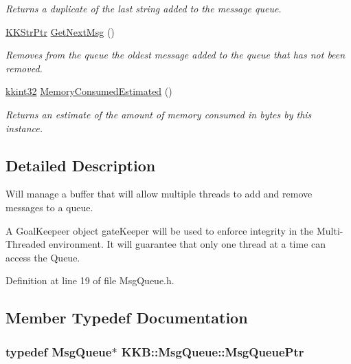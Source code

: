 \begin{DoxyCompactItemize}
\begin{DoxyCompactList}\small\item\em Returns a duplicate of the last string added to the message queue. \end{DoxyCompactList}\item 
\hyperlink{namespace_k_k_b_a9adbef5a6b3be0867f5570df2a08f388}{K\+K\+Str\+Ptr} \hyperlink{class_k_k_b_1_1_msg_queue_a4e280303e6b11471624e1274cc681649}{Get\+Next\+Msg} ()
\begin{DoxyCompactList}\small\item\em Removes from the queue the oldest message added to the queue that has not been removed. \end{DoxyCompactList}\item 
\hyperlink{namespace_k_k_b_a8fa4952cc84fda1de4bec1fbdd8d5b1b}{kkint32} \hyperlink{class_k_k_b_1_1_msg_queue_afe6ceeb9745ccf087a35eca6e83b026f}{Memory\+Consumed\+Estimated} ()
\begin{DoxyCompactList}\small\item\em Returns an estimate of the amount of memory consumed in bytes by this instance. \end{DoxyCompactList}\end{DoxyCompactItemize}


\subsection{Detailed Description}
Will manage a buffer that will allow multiple threads to add and remove messages to a queue. 

A \textquotesingle{}Goal\+Keepeer\textquotesingle{} object \textquotesingle{}gate\+Keeper\textquotesingle{} will be used to enforce integrity in the Multi-\/\+Threaded environment. It will guarantee that only one thread at a time can access the Queue. 

Definition at line 19 of file Msg\+Queue.\+h.



\subsection{Member Typedef Documentation}
\subsubsection[{\texorpdfstring{Msg\+Queue\+Ptr}{MsgQueuePtr}}]{\setlength{\rightskip}{0pt plus 5cm}typedef {\bf Msg\+Queue}$\ast$ {\bf K\+K\+B\+::\+Msg\+Queue\+::\+Msg\+Queue\+Ptr}}\hypertarget{class_k_k_b_1_1_msg_queue_a4799b7792832f5357e7679b252f7a750}{}\label{class_k_k_b_1_1_msg_queue_a4799b7792832f5357e7679b252f7a750}


